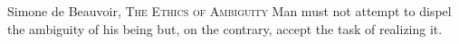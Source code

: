 \thispagestyle{empty}


\vspace*{5cm}

\medskip

\begin{center}
\begin{chapquote}{Simone de Beauvoir, \textsc{The Ethics of Ambiguity}}
\noindent
Man must not attempt to dispel the ambiguity of his being but, on the contrary, accept the task of realizing it.
\end{chapquote}
\end{center}